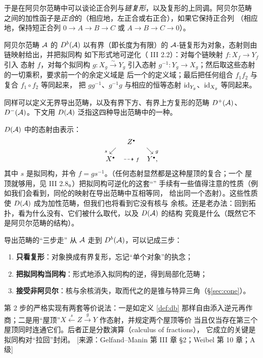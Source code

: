 于是在阿贝尔范畴中可以谈论正合列与\emph{链复形}，以及复形的上同调。阿贝尔范畴
之间的加性函子是\emph{正合}的（相应地，左正合或右正合），如果它保持正合列
（相应地，保持短正合列 $0\to A\to B\to C$ 或 $A\to B\to C\to 0$）。

\begin{definition}\label{def:db}
阿贝尔范畴 $\mathcal{A}$ 的 $D^b(\mathcal{A})$
以有界（即长度为有限）的 $\mathcal{A}$-链复形为对象，态射则由链映射给出，并把拟同构
如下形式地可逆化（\cite{GM} III 2.2）：对每个链映射 $f\colon X_f\to Y_f$ 引入
态射 $f$，对每个拟同构 $g\colon X_g\xrightarrow{\sim}Y_g$ 引入态射
$g^{-1}\colon Y_g\to X_g$；然后取这些态射的一切乘积，要求前一个的余定义域是
后一个的定义域；最后把任何组合 $f_1f_2$ 与复合 $f_1\circ f_2$ 等同起来，
把 $gg^{-1}$、$g^{-1}g$ 与相应的恒等态射 $\operatorname{id}_{Y_g}$、$\operatorname{id}_{X_g}$ 等同起来。
\end{definition}

\begin{remark}\label{rem:four}
同样可以定义无界导出范畴，以及有界下方、有界上方复形的范畴 $D^+(\mathcal{A})$、
$D^-(\mathcal{A})$。下文用 $D(\mathcal{A})$ 泛指这四种导出范畴中的一种。
\end{remark}

$D(\mathcal{A})$ 中的态射由表示：
$$
\begin{array}{ccc}
& Z^{\scriptscriptstyle\bullet} & \\
{\scriptstyle s}\swarrow & & \searrow{\scriptstyle g} \\
X^{\scriptscriptstyle\bullet} & \dashrightarrow{\scriptstyle f} & Y^{\scriptscriptstyle\bullet},
\end{array}
$$
其中 $s$ 是拟同构，并令 $f=gs^{-1}$。（任何态射显然都是这种屋顶的复合；一个
屋顶就够用，见 \cite{GM} III 2.8。）把拟同构可逆化的这套“”
手续有一些值得注意的性质（例如我们会看到，同伦的映射在导出范畴中互相等同，
给出同一个态射）。这些性质使 $D(\mathcal{A})$ 成为加性范畴，但我们也将看到它没有核与
余核。还是老办法：回到拓扑，看为什么没有、它们被什么取代，以及 $D(\mathcal{A})$ 的结构
究竟是什么（既然它不是阿贝尔范畴的结构）。

\begin{conceptbox}{导出范畴的“三步走”}
从 $\mathcal{A}$ 走到 $D^b(\mathcal{A})$，可以记成三步：
\begin{enumerate}[leftmargin=1.6em,itemsep=2pt,topsep=2pt]
\item \textbf{只看复形}：对象换成有界复形，忘记“单个对象”的执念；
\item \textbf{把拟同构当同构}：形式地添入拟同构的逆，得到局部化范畴；
\item \textbf{接受非阿贝尔}：核与余核消失，取而代之的是锥与特异三角（§\ref{sec:cone}）。
\end{enumerate}
第 2 步的严格实现有两套等价说法：一是如定义 \ref{def:db} 那样自由添入逆元再作
商；二是用“屋顶”$X\xleftarrow{s}Z\xrightarrow{g}Y$ 作态射，并规定两个屋顶等价
当且仅当存在第三个屋顶同时连通它们。后者正是分数演算（calculus of fractions），
它成立的关键是拟同构对“拉回”封闭。
[来源：Gelfand--Manin 第 III 章 §2；Weibel 第 10 章；A 级]
\end{conceptbox}

